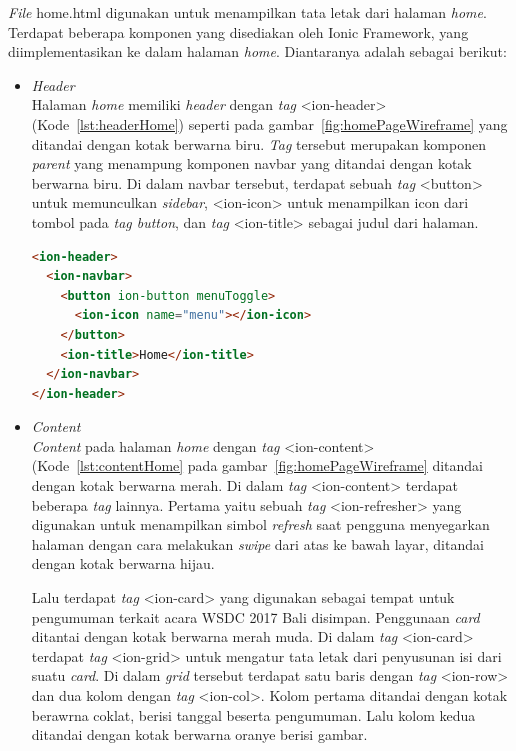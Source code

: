 \begin{itemize}
\textit{File} home.html digunakan untuk menampilkan tata letak dari halaman \textit{home}. Terdapat beberapa komponen yang disediakan oleh Ionic Framework, yang diimplementasikan ke dalam halaman \textit{home}. Diantaranya adalah sebagai berikut:	

	\begin{itemize}
		\item \textit{Header} \\
		Halaman \textit{home} memiliki \textit{header} dengan \textit{tag} <ion-header> (Kode~\ref{lst:headerHome}) seperti pada gambar~\ref{fig:homePageWireframe} yang ditandai dengan kotak berwarna biru. \textit{Tag} tersebut merupakan komponen \textit{parent} yang menampung komponen navbar yang ditandai dengan kotak berwarna biru. Di dalam navbar tersebut, terdapat sebuah \textit{tag} <button> untuk memunculkan \textit{sidebar}, <ion-icon> untuk menampilkan icon dari tombol pada \textit{tag button}, dan \textit{tag} <ion-title> sebagai judul dari halaman.

\newpage		
		
\begin{lstlisting}[language=html, label={lst:headerHome}, caption=\textit{Header} pada home.html]
<ion-header>
  <ion-navbar>
    <button ion-button menuToggle>
      <ion-icon name="menu"></ion-icon>
    </button>
    <ion-title>Home</ion-title>
  </ion-navbar>
</ion-header>
\end{lstlisting}

		\item \textit{Content} \\
		\textit{Content} pada halaman \textit{home} dengan \textit{tag} <ion-content> (Kode~\ref{lst:contentHome} pada gambar~\ref{fig:homePageWireframe} ditandai dengan kotak berwarna merah. Di dalam \textit{tag} <ion-content> terdapat beberapa \textit{tag} lainnya. Pertama yaitu sebuah \textit{tag} <ion-refresher> yang digunakan untuk menampilkan simbol \textit{refresh} saat pengguna menyegarkan halaman dengan cara melakukan \textit{swipe} dari atas ke bawah layar, ditandai dengan kotak berwarna hijau. 
		
		Lalu terdapat \textit{tag} <ion-card> yang digunakan sebagai tempat untuk pengumuman terkait acara WSDC 2017 Bali disimpan. Penggunaan \textit{card} ditantai dengan kotak berwarna merah muda. Di dalam \textit{tag} <ion-card> terdapat \textit{tag} <ion-grid> untuk mengatur tata letak dari penyusunan isi dari suatu \textit{card}. Di dalam \textit{grid} tersebut terdapat satu baris dengan \textit{tag} <ion-row> dan dua kolom dengan \textit{tag} <ion-col>. Kolom pertama ditandai dengan kotak berawrna coklat, berisi tanggal beserta pengumuman. Lalu kolom kedua ditandai dengan kotak berwarna oranye berisi gambar.
		

\end{itemize}
\end{itemize}
